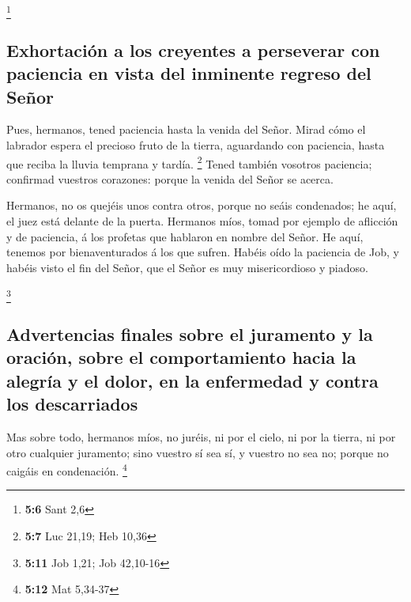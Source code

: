 \footnote{\textbf{5:6} Sant 2,6}

\hypertarget{exhortaciuxf3n-a-los-creyentes-a-perseverar-con-paciencia-en-vista-del-inminente-regreso-del-seuxf1or}{%
\subsection{Exhortación a los creyentes a perseverar con paciencia en
vista del inminente regreso del
Señor}\label{exhortaciuxf3n-a-los-creyentes-a-perseverar-con-paciencia-en-vista-del-inminente-regreso-del-seuxf1or}}

 Pues, hermanos, tened paciencia hasta la venida del Señor.
Mirad cómo el labrador espera el precioso fruto de la tierra, aguardando
con paciencia, hasta que reciba la lluvia temprana y tardía. \footnote{\textbf{5:7}
  Luc 21,19; Heb 10,36}  Tened también vosotros paciencia;
confirmad vuestros corazones: porque la venida del Señor se acerca.

 Hermanos, no os quejéis unos contra otros, porque no seáis
condenados; he aquí, el juez está delante de la puerta. 
Hermanos míos, tomad por ejemplo de aflicción y de paciencia, á los
profetas que hablaron en nombre del Señor.  He aquí,
tenemos por bienaventurados á los que sufren. Habéis oído la paciencia
de Job, y habéis visto el fin del Señor, que el Señor es muy
misericordioso y piadoso.

\footnote{\textbf{5:11} Job 1,21; Job 42,10-16}

\hypertarget{advertencias-finales-sobre-el-juramento-y-la-oraciuxf3n-sobre-el-comportamiento-hacia-la-alegruxeda-y-el-dolor-en-la-enfermedad-y-contra-los-descarriados}{%
\subsection{Advertencias finales sobre el juramento y la oración, sobre
el comportamiento hacia la alegría y el dolor, en la enfermedad y contra
los
descarriados}\label{advertencias-finales-sobre-el-juramento-y-la-oraciuxf3n-sobre-el-comportamiento-hacia-la-alegruxeda-y-el-dolor-en-la-enfermedad-y-contra-los-descarriados}}

 Mas sobre todo, hermanos míos, no juréis, ni por el cielo,
ni por la tierra, ni por otro cualquier juramento; sino vuestro sí sea
sí, y vuestro no sea no; porque no caigáis en condenación. \footnote{\textbf{5:12}
  Mat 5,34-37}

